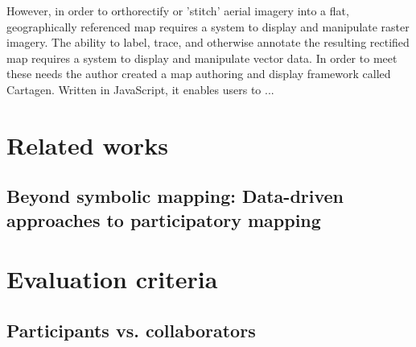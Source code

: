 \documentclass[11pt]{report}
\begin{document}
However, in order to orthorectify or 'stitch' aerial imagery into a flat, geographically referenced map requires a system to display and manipulate raster imagery. The ability to label, trace, and otherwise annotate the resulting rectified map requires a system to display and manipulate vector data. In order to meet these needs the author created a map authoring and display framework called Cartagen. Written in JavaScript, it enables users to ...


\chapter{Related works}
\section{Beyond symbolic mapping: Data-driven approaches to participatory mapping}

\chapter{Evaluation criteria}
\section{Participants vs. collaborators}
\end{document}
